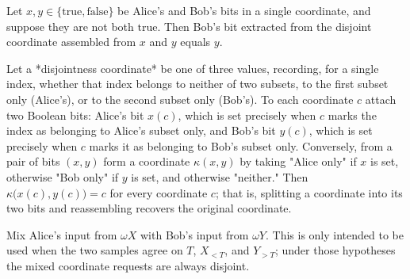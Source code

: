 \begin{theorem}
\label{CommunicationComplexity.Functions.Disjointness.RandomizedLowerBound.coordinateOfBits_yBit}
\leanok
{}
Let $x, y \in \{\mathrm{true}, \mathrm{false}\}$ be Alice's and Bob's bits in a single
coordinate, and suppose they are not both $\mathrm{true}$. Then Bob's bit extracted from
the disjoint coordinate assembled from $x$ and $y$ equals $y$.
\end{theorem}

\begin{theorem}
\label{CommunicationComplexity.Functions.Disjointness.RandomizedLowerBound.coordinateOfBits_xBit_yBit}
\leanok
{}
Let a *disjointness coordinate* be one of three values, recording, for a single index,
whether that index belongs to neither of two subsets, to the first subset only
(Alice's), or to the second subset only (Bob's). To each coordinate $c$ attach two
Boolean bits: Alice's bit $x(c)$, which is set precisely when $c$ marks the index as
belonging to Alice's subset only, and Bob's bit $y(c)$, which is set precisely when $c$
marks it as belonging to Bob's subset only. Conversely, from a pair of bits $(x, y)$
form a coordinate $\kappa(x, y)$ by taking "Alice only" if $x$ is set, otherwise "Bob
only" if $y$ is set, and otherwise "neither." Then $\kappa\bigl(x(c), y(c)\bigr) = c$
for every coordinate $c$; that is, splitting a coordinate into its two bits and
reassembling recovers the original coordinate.
\end{theorem}

\begin{definition}[Mix]
\label{CommunicationComplexity.Functions.Disjointness.RandomizedLowerBound.mix}
\leanok
{}
Mix Alice's input from $ωX$ with Bob's input from $ωY$. This is only intended to be used when the two samples agree on $T$, $X_{<T}$, and $Y_{>T}$; under those hypotheses the mixed coordinate requests are always disjoint.
\end{definition}

